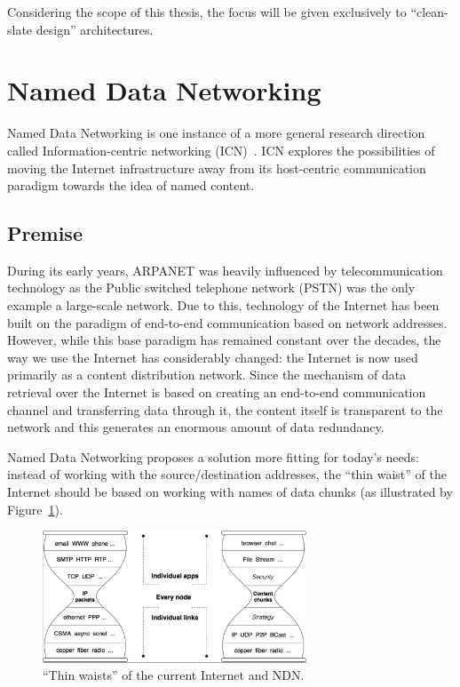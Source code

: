         Considering the scope of this thesis, the focus will be given exclusively to ``clean-slate design'' architectures.

    \section{Named Data Networking}\label{archs:ndn}

        Named Data Networking is one instance of a more general research direction called Information-centric networking (ICN)~\cite{icn}. ICN explores the possibilities of moving the Internet infrastructure away from its host-centric communication paradigm towards the idea of named content.

        \subsection{Premise}

            During its early years, ARPANET was heavily influenced by telecommunication technology as the Public switched telephone network (PSTN) was the only example a large-scale network. Due to this, technology of the Internet has been built on the paradigm of end-to-end communication based on network addresses. However, while this base paradigm has remained constant over the decades, the way we use the Internet has considerably changed: the Internet is now used primarily as a content distribution network. Since the mechanism of data retrieval over the Internet is based on creating an end-to-end communication channel and transferring data through it, the content itself is transparent to the network and this generates an enormous amount of data redundancy.

            Named Data Networking proposes a solution more fitting for today's needs: instead of working with the source/destination addresses, the ``thin waist'' of the Internet should be based on working with names of data chunks (as illustrated by Figure~\ref{fig:ndn_waist}).

            \begin{figure}[H]
                \begin{center}
                    \includegraphics[width=0.7\textwidth]{fig/archs_ndn-hourglass.png}
                  \caption{``Thin waists'' of the current Internet and NDN.}
                  \label{fig:ndn_waist}
                \end{center}
            \end{figure}

